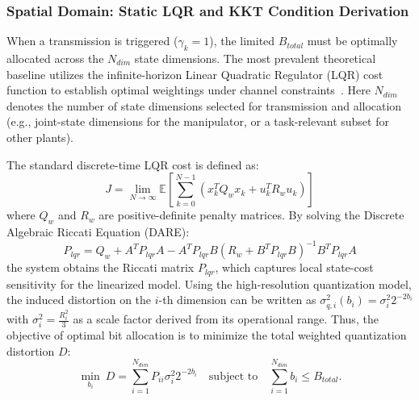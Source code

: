 \subsubsection{Spatial Domain: Static LQR and KKT Condition Derivation}
When a transmission is triggered ($\gamma_k = 1$), the limited $B_{total}$ must be optimally allocated across the $N_{dim}$ state dimensions. The most prevalent theoretical baseline utilizes the infinite-horizon Linear Quadratic Regulator (LQR) cost function to establish optimal weightings under channel constraints~\cite{intro_cucc}.
Here $N_{dim}$ denotes the number of state dimensions selected for transmission and allocation (e.g., joint-state dimensions for the manipulator, or a task-relevant subset for other plants).

The standard discrete-time LQR cost is defined as:
\begin{equation}
    J = \lim_{N \to \infty} \mathbb{E} \left[ \sum_{k=0}^{N-1} (x_k^T Q_w x_k + u_k^T R_w u_k) \right]
\end{equation}
where $Q_w$ and $R_w$ are positive-definite penalty matrices. By solving the Discrete Algebraic Riccati Equation (DARE):
\begin{equation}
    P_{lqr} = Q_w + A^T P_{lqr} A - A^T P_{lqr} B (R_w + B^T P_{lqr} B)^{-1} B^T P_{lqr} A
\end{equation}
the system obtains the Riccati matrix $P_{lqr}$, which captures local state-cost sensitivity for the linearized model. Using the high-resolution quantization model, the induced distortion on the $i$-th dimension can be written as $\sigma_{q,i}^2(b_i)=\sigma_i^2 2^{-2b_i}$ with $\sigma_i^2=\frac{R_i^2}{3}$ as a scale factor derived from its operational range. Thus, the objective of optimal bit allocation is to minimize the total weighted quantization distortion $D$:
\begin{equation} \label{eq:optimization_problem}
    \min_{b_i} \ D = \sum_{i=1}^{N_{dim}} P_{ii} \sigma_i^2 2^{-2b_i} \quad \text{subject to} \quad \sum_{i=1}^{N_{dim}} b_i \le B_{total}.
\end{equation}

